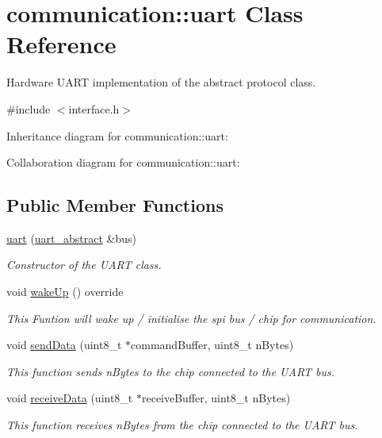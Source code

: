 \hypertarget{classcommunication_1_1uart}{}\section{communication\+:\+:uart Class Reference}
\label{classcommunication_1_1uart}


Hardware U\+A\+RT implementation of the abstract protocol class.  




{\ttfamily \#include $<$interface.\+h$>$}



Inheritance diagram for communication\+:\+:uart\+:


Collaboration diagram for communication\+:\+:uart\+:
\subsection*{Public Member Functions}
\begin{DoxyCompactItemize}
\item 
\hyperlink{classcommunication_1_1uart_a6d657ea9323428aae6737ca31c206bb1}{uart} (\hyperlink{classuart__abstract}{uart\+\_\+abstract} \&bus)
\begin{DoxyCompactList}\small\item\em Constructor of the U\+A\+RT class. \end{DoxyCompactList}\item 
void \hyperlink{classcommunication_1_1uart_aea97e95d698c8738fb891e5f0d65e288}{wake\+Up} () override
\begin{DoxyCompactList}\small\item\em This Funtion will wake up / initialise the spi bus / chip for communication. \end{DoxyCompactList}\item 
void \hyperlink{classcommunication_1_1uart_a915087d1f825171d705801de0981b151}{send\+Data} (uint8\+\_\+t $\ast$command\+Buffer, uint8\+\_\+t n\+Bytes)
\begin{DoxyCompactList}\small\item\em This function sends n\+Bytes to the chip connected to the U\+A\+RT bus. \end{DoxyCompactList}\item 
void \hyperlink{classcommunication_1_1uart_a37a51dcb95fb5178b5fa441acd437ae4}{receive\+Data} (uint8\+\_\+t $\ast$receive\+Buffer, uint8\+\_\+t n\+Bytes)
\begin{DoxyCompactList}\small\item\em This function receives n\+Bytes from the chip connected to the U\+A\+RT bus. \end{DoxyCompactList}\end{DoxyCompactItemize}



